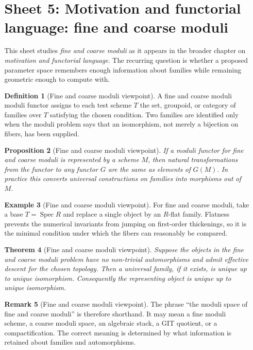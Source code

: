 \documentclass[11pt]{amsart}
\newtheorem{theorem}{Theorem}[section]
\newtheorem{proposition}[theorem]{Proposition}
\theoremstyle{definition}
\newtheorem{definition}[theorem]{Definition}
\newtheorem{example}[theorem]{Example}
\newtheorem{remark}[theorem]{Remark}
\newcommand{\Spec}{\operatorname{Spec}}
\begin{document}
\section{Sheet 5: Motivation and functorial language: fine and coarse moduli}
This sheet studies \emph{fine and coarse moduli} as it appears in the broader chapter on \emph{motivation and functorial language}.  The recurring question is whether a proposed parameter space remembers enough information about families while remaining geometric enough to compute with.
\begin{definition}[Fine and coarse moduli viewpoint]
A fine and coarse moduli moduli functor assigns to each test scheme $T$ the set, groupoid, or category of families over $T$ satisfying the chosen condition.  Two families are identified only when the moduli problem says that an isomorphism, not merely a bijection on fibers, has been supplied.
\end{definition}
\begin{proposition}[Fine and coarse moduli viewpoint]
If a moduli functor for fine and coarse moduli is represented by a scheme $M$, then natural transformations from the functor to any functor $G$ are the same as elements of $G(M)$.  In practice this converts universal constructions on families into morphisms out of $M$.
\end{proposition}
\begin{example}[Fine and coarse moduli viewpoint]
For fine and coarse moduli, take a base $T=\Spec R$ and replace a single object by an $R$-flat family.  Flatness prevents the numerical invariants from jumping on first-order thickenings, so it is the minimal condition under which the fibers can reasonably be compared.
\end{example}
\begin{theorem}[Fine and coarse moduli viewpoint]
Suppose the objects in the fine and coarse moduli problem have no non-trivial automorphisms and admit effective descent for the chosen topology.  Then a universal family, if it exists, is unique up to unique isomorphism.  Consequently the representing object is unique up to unique isomorphism.
\end{theorem}
\begin{remark}[Fine and coarse moduli viewpoint]
The phrase ``the moduli space of fine and coarse moduli'' is therefore shorthand.  It may mean a fine moduli scheme, a coarse moduli space, an algebraic stack, a GIT quotient, or a compactification.  The correct meaning is determined by what information is retained about families and automorphisms.
\end{remark}
\end{document}
